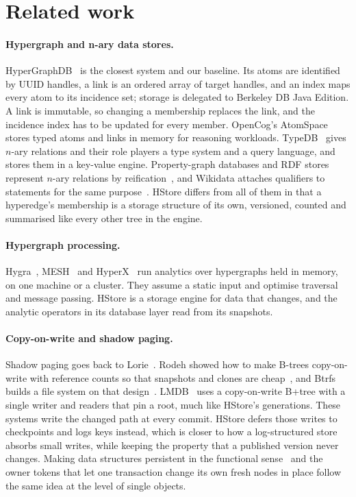 \section{Related work}
\label{sec:related}

\paragraph{Hypergraph and n-ary data stores.} HyperGraphDB~\cite{hgdb} is the closest system and our baseline. Its atoms are identified by UUID handles, a link is an ordered array of target handles, and an index maps every atom to its incidence set; storage is delegated to Berkeley DB Java Edition. A link is immutable, so changing a membership replaces the link, and the incidence index has to be updated for every member. OpenCog's AtomSpace~\cite{opencog} stores typed atoms and links in memory for reasoning workloads. TypeDB~\cite{typeql} gives $n$-ary relations and their role players a type system and a query language, and stores them in a key-value engine. Property-graph databases and RDF stores represent $n$-ary relations by reification~\cite{angles}, and Wikidata attaches qualifiers to statements for the same purpose~\cite{wikidata}. HStore differs from all of them in that a hyperedge's membership is a storage structure of its own, versioned, counted and summarised like every other tree in the engine.

\paragraph{Hypergraph processing.} Hygra~\cite{hygra}, MESH~\cite{mesh} and HyperX~\cite{hyperx} run analytics over hypergraphs held in memory, on one machine or a cluster. They assume a static input and optimise traversal and message passing. HStore is a storage engine for data that changes, and the analytic operators in its database layer read from its snapshots.

\paragraph{Copy-on-write and shadow paging.} Shadow paging goes back to Lorie~\cite{lorie}. Rodeh showed how to make B-trees copy-on-write with reference counts so that snapshots and clones are cheap~\cite{rodeh-shadowing}, and Btrfs builds a file system on that design~\cite{btrfs}. LMDB~\cite{lmdb} uses a copy-on-write B+tree with a single writer and readers that pin a root, much like HStore's generations. These systems write the changed path at every commit. HStore defers those writes to checkpoints and logs keys instead, which is closer to how a log-structured store absorbs small writes, while keeping the property that a published version never changes. Making data structures persistent in the functional sense~\cite{persistent} and the owner tokens that let one transaction change its own fresh nodes in place follow the same idea at the level of single objects.

